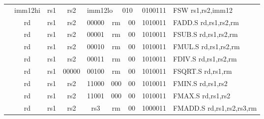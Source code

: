 \begin{table}[p]
\begin{small}
\begin{center}
\begin{tabular}{rccccccccccl}
&
\multicolumn{1}{|c|}{imm12hi} &
\multicolumn{1}{c|}{rs1} &
\multicolumn{1}{c|}{rs2} &
\multicolumn{4}{c|}{imm12lo} &
\multicolumn{2}{c|}{010} &
\multicolumn{1}{c|}{0100111} & FSW rs1,rs2,imm12 \\
\cline{2-11}
  

&
\multicolumn{1}{|c|}{rd} &
\multicolumn{1}{c|}{rs1} &
\multicolumn{1}{c|}{rs2} &
\multicolumn{3}{c|}{00000} &
\multicolumn{2}{c|}{rm} &
\multicolumn{1}{c|}{00} &
\multicolumn{1}{c|}{1010011} & FADD.S rd,rs1,rs2,rm \\
\cline{2-11}
  

&
\multicolumn{1}{|c|}{rd} &
\multicolumn{1}{c|}{rs1} &
\multicolumn{1}{c|}{rs2} &
\multicolumn{3}{c|}{00001} &
\multicolumn{2}{c|}{rm} &
\multicolumn{1}{c|}{00} &
\multicolumn{1}{c|}{1010011} & FSUB.S rd,rs1,rs2,rm \\
\cline{2-11}
  

&
\multicolumn{1}{|c|}{rd} &
\multicolumn{1}{c|}{rs1} &
\multicolumn{1}{c|}{rs2} &
\multicolumn{3}{c|}{00010} &
\multicolumn{2}{c|}{rm} &
\multicolumn{1}{c|}{00} &
\multicolumn{1}{c|}{1010011} & FMUL.S rd,rs1,rs2,rm \\
\cline{2-11}
  

&
\multicolumn{1}{|c|}{rd} &
\multicolumn{1}{c|}{rs1} &
\multicolumn{1}{c|}{rs2} &
\multicolumn{3}{c|}{00011} &
\multicolumn{2}{c|}{rm} &
\multicolumn{1}{c|}{00} &
\multicolumn{1}{c|}{1010011} & FDIV.S rd,rs1,rs2,rm \\
\cline{2-11}
  

&
\multicolumn{1}{|c|}{rd} &
\multicolumn{1}{c|}{rs1} &
\multicolumn{1}{c|}{00000} &
\multicolumn{3}{c|}{00100} &
\multicolumn{2}{c|}{rm} &
\multicolumn{1}{c|}{00} &
\multicolumn{1}{c|}{1010011} & FSQRT.S rd,rs1,rm \\
\cline{2-11}
  

&
\multicolumn{1}{|c|}{rd} &
\multicolumn{1}{c|}{rs1} &
\multicolumn{1}{c|}{rs2} &
\multicolumn{3}{c|}{11000} &
\multicolumn{2}{c|}{000} &
\multicolumn{1}{c|}{00} &
\multicolumn{1}{c|}{1010011} & FMIN.S rd,rs1,rs2 \\
\cline{2-11}
  

&
\multicolumn{1}{|c|}{rd} &
\multicolumn{1}{c|}{rs1} &
\multicolumn{1}{c|}{rs2} &
\multicolumn{3}{c|}{11001} &
\multicolumn{2}{c|}{000} &
\multicolumn{1}{c|}{00} &
\multicolumn{1}{c|}{1010011} & FMAX.S rd,rs1,rs2 \\
\cline{2-11}
  

&
\multicolumn{1}{|c|}{rd} &
\multicolumn{1}{c|}{rs1} &
\multicolumn{1}{c|}{rs2} &
\multicolumn{3}{c|}{rs3} &
\multicolumn{2}{c|}{rm} &
\multicolumn{1}{c|}{00} &
\multicolumn{1}{c|}{1000011} & FMADD.S rd,rs1,rs2,rs3,rm \\
\cline{2-11}
  


\end{tabular}
\end{center}
\end{small}
\end{table}
